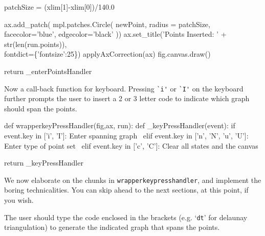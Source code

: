              patchSize  = (xlim[1]-xlim[0])/140.0
                   
             ax.add_patch( mpl.patches.Circle( newPoint, radius = patchSize,
                                               facecolor='blue', edgecolor='black'  ))
             ax.set_title('Points Inserted: ' + str(len(run.points)), \\
                           fontdict=\{'fontsize':25\})
             applyAxCorrection(ax)
             fig.canvas.draw()

    return _enterPointsHandler
\nwendcode{}\nwdocspar

Now a call-back function for keyboard. Pressing \verb|`i'| or \verb|`I'| on the keyboard further prompts the 
user to insert a 2 or 3 letter code to indicate which graph should span the points. 

\nwenddocs{}\plusendmoddef\nwstartdeflinemarkup{}\nwenddeflinemarkup
def wrapperkeyPressHandler(fig,ax, run): 
       def _keyPressHandler(event):
               if event.key in ['i', 'I']:                     
                     \LA{}Enter spanning graph~{\nwtagstyle{}}\RA{}    
               elif event.key in ['n', 'N', 'u', 'U']: 
                     \LA{}Enter type of point set~{\nwtagstyle{}}\RA{}                   
               elif event.key in ['c', 'C']: 
                     \LA{}Clear all states and the canvas~{\nwtagstyle{}}\RA{}
                   
       return _keyPressHandler
\nwendcode{}\nwdocspar

We now elaborate on the chunks in \verb|wrapperkeypresshandler|, and implement the boring technicalities. You 
can skip ahead to the next sections, at this point, if you wish. 

The user should type the code enclosed in the brackets (e.g. `\verb|dt|' for delaunay triangulation) to generate the 
indicated graph that spans the points. 

